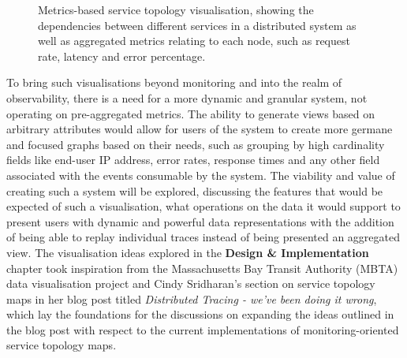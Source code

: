 \documentclass[12pt,pdftex,titlepage]{report}
\begin{document}
                \begin{figure}[hbt!]
                    \centering
                    \caption{Metrics-based service topology visualisation, showing the dependencies between different services in a distributed system as well as
                    aggregated metrics relating to each node, such as request rate, latency and error percentage.}
                \end{figure}
                
                To bring such visualisations beyond monitoring and into the realm of observability, there is a need for a more dynamic and granular 
                system, not operating on pre-aggregated metrics. The ability to generate views based on arbitrary attributes would allow for users 
                of the system to create more germane and focused graphs based on their needs, such as grouping by high cardinality fields like end-user IP address, 
                error rates, response times and any other field associated with the events consumable by the system\cite{doingitwrongtopo}. The viability and 
                value of creating such a system will be explored, discussing the features that would be expected of such a visualisation, what operations on the
                data it would support to present users with dynamic and powerful data representations with the addition of being able to replay individual traces 
                instead of being presented an aggregated view. The visualisation ideas explored in the \textbf{Design \& Implementation} chapter took inspiration from
                the Massachusetts Bay Transit Authority (MBTA) data visualisation project\cite{mbta} and Cindy Sridharan's section on service topology maps in her blog 
                post titled \textit{Distributed Tracing - we've been doing it wrong}\cite{doingitwrongtopo}, which lay the foundations for the discussions on 
                expanding the ideas outlined in the blog post with respect to the current implementations of monitoring-oriented service topology maps.
    
\end{document}
